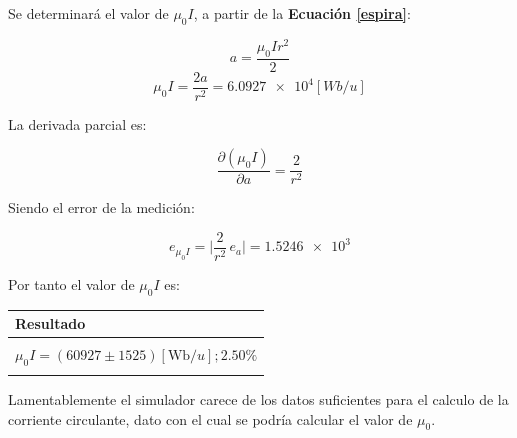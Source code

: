 \documentclass[letter,11pt]{article}
\begin{document}
Se determinará el valor de $\mu_0 I$, a partir de la
\textbf{Ecuación \ref{espira}}:

\begin{equation*}
    a = \frac{\mu_0 I r^2}{2}
\end{equation*}
\begin{equation*}
    \mu_0 I = \frac{2a}{r^2} = \num{6.0927e4} [Wb/u]
\end{equation*}

La derivada parcial es:

\begin{equation*}
    \frac{\partial (\mu_0 I)}{\partial a} = \frac{2}{r^2}
\end{equation*}

Siendo el error de la medición:

\begin{equation*}
    e_{\mu_0 I} = \Biggr| \frac{2}{r^2}\,e_a \Biggr| = \num{1.5246e3}
\end{equation*}

Por tanto el valor de $\mu_0 I$ es:

\begin{center}
\begin{tabular}{|>{\centering}m{12.0cm}<{\centering}|}
\hline
\textbf{Resultado}
\tabularnewline \hline
\\
    $\mu_0 I = (60927 \pm 1525)[\text{Wb}/u]; 2.50\%$ \tabularnewline
\\
\hline
\end{tabular}
\end{center}

Lamentablemente el simulador carece de los datos suficientes para el calculo de
la corriente circulante, dato con el cual se podría calcular el valor de
$\mu_0$.
\end{document}

